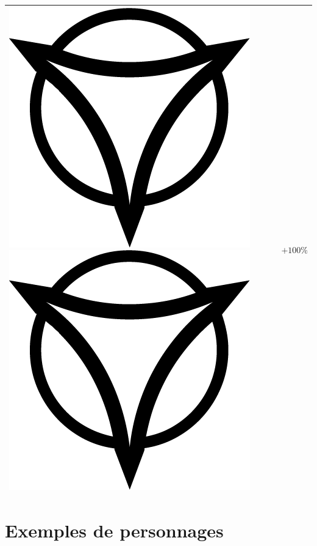 \documentclass{article}
\begin{document}
\begin{center}
\begin{tabular}[b]{|p{5cm}|p{1cm}|}
		\hline 
		{\Large \includegraphics[height=\fontcharht\font`\B]{../img/result_desastre_despair} \includegraphics[height=\fontcharht\font`\B]{../img/result_desastre_despair}} & $+100\%$ \\ 
		\hline 
	\end{tabular} 
\end{center}

\part*{Exemples de personnages}
\end{document}
